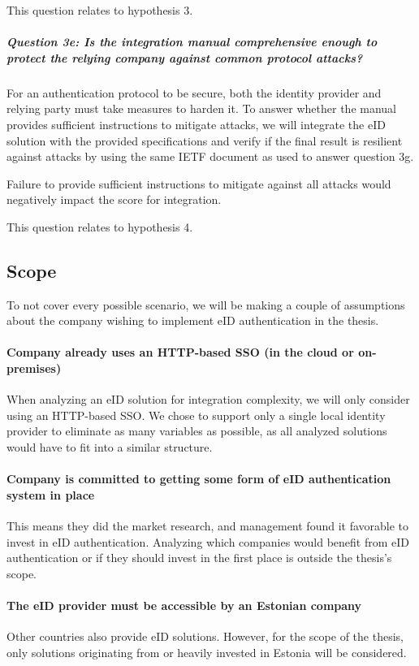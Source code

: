This question relates to hypothesis 3.

\subparagraph{Question 3e: Is the integration manual comprehensive enough to protect the relying company against common protocol attacks?}\noindent

For an authentication protocol to be secure, both the identity provider and relying party must take measures to harden it. To answer whether the manual provides sufficient instructions to mitigate attacks, we will integrate the eID solution with the provided specifications and verify if the final result is resilient against attacks by using the same IETF document as used to answer question 3g.

Failure to provide sufficient instructions to mitigate against all attacks would negatively impact the score for integration.

This question relates to hypothesis 4.

\subsection{Scope}

To not cover every possible scenario, we will be making a couple of assumptions about the company wishing to implement eID authentication in the thesis.

\paragraph{Company already uses an HTTP-based SSO (in the cloud or on-premises)} When analyzing an eID solution for integration complexity, we will only consider using an HTTP-based SSO. We chose to support only a single local identity provider to eliminate as many variables as possible, as all analyzed solutions would have to fit into a similar structure.

\paragraph{Company is committed to getting some form of eID authentication system in place} This means they did the market research, and management found it favorable to invest in eID authentication. Analyzing which companies would benefit from eID authentication or if they should invest in the first place is outside the thesis's scope.

\paragraph{The eID provider must be accessible by an Estonian company} Other countries also provide eID solutions. However, for the scope of the thesis, only solutions originating from or heavily invested in Estonia will be considered.

